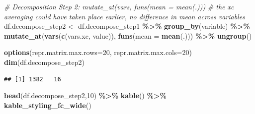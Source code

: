 \documentclass[
]{book}
\newenvironment{Shaded}{\begin{snugshade}}{\end{snugshade}}
\newcommand{\CommentTok}[1]{\textcolor[rgb]{0.56,0.35,0.01}{\textit{#1}}}
\newcommand{\DataTypeTok}[1]{\textcolor[rgb]{0.13,0.29,0.53}{#1}}
\newcommand{\DecValTok}[1]{\textcolor[rgb]{0.00,0.00,0.81}{#1}}
\newcommand{\KeywordTok}[1]{\textcolor[rgb]{0.13,0.29,0.53}{\textbf{#1}}}
\newcommand{\NormalTok}[1]{#1}
\newcommand{\OperatorTok}[1]{\textcolor[rgb]{0.81,0.36,0.00}{\textbf{#1}}}
\newcommand{\StringTok}[1]{\textcolor[rgb]{0.31,0.60,0.02}{#1}}
\begin{document}
\begin{Shaded}
\begin{Highlighting}[]
\CommentTok{\# Decomposition Step 2: mutate\_at(vars, funs(mean = mean(.)))}
\CommentTok{\# the xc averaging could have taken place earlier, no difference in mean across variables}
\NormalTok{df.decompose\_step2 \textless{}{-}}\StringTok{ }\NormalTok{df.decompose\_step1 }\OperatorTok{\%\textgreater{}\%}
\StringTok{                        }\KeywordTok{group\_by}\NormalTok{(variable) }\OperatorTok{\%\textgreater{}\%}
\StringTok{                        }\KeywordTok{mutate\_at}\NormalTok{(}\KeywordTok{vars}\NormalTok{(}\KeywordTok{c}\NormalTok{(vars.xc, }\StringTok{\textquotesingle{}value\textquotesingle{}}\NormalTok{)), }\KeywordTok{funs}\NormalTok{(}\DataTypeTok{mean =} \KeywordTok{mean}\NormalTok{(.))) }\OperatorTok{\%\textgreater{}\%}
\StringTok{                        }\KeywordTok{ungroup}\NormalTok{()}

\KeywordTok{options}\NormalTok{(}\DataTypeTok{repr.matrix.max.rows=}\DecValTok{20}\NormalTok{, }\DataTypeTok{repr.matrix.max.cols=}\DecValTok{20}\NormalTok{)}
\KeywordTok{dim}\NormalTok{(df.decompose\_step2)}
\end{Highlighting}
\end{Shaded}

\begin{verbatim}
## [1] 1382   16
\end{verbatim}

\begin{Shaded}
\begin{Highlighting}[]
\KeywordTok{head}\NormalTok{(df.decompose\_step2,}\DecValTok{10}\NormalTok{) }\OperatorTok{\%\textgreater{}\%}
\StringTok{  }\KeywordTok{kable}\NormalTok{() }\OperatorTok{\%\textgreater{}\%}
\StringTok{  }\KeywordTok{kable\_styling\_fc\_wide}\NormalTok{()}
\end{Highlighting}
\end{Shaded}
\end{document}
